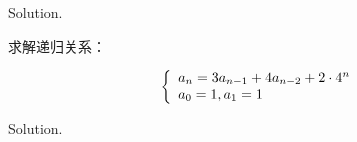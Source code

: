 \documentclass[cn, hazy, blue, normal, 12pt]{elegantnote}
\begin{document}
\begin{solution}[print=true]

    Solution.

\end{solution}

\begin{exercise}

    求解递归关系：

    \begin{equation}
        \notag
        \left\{\begin{array}{l}
            a_{n}=3 a_{n-1}+4 a_{n-2}+2 \cdot 4^{n} \\
            a_{0}=1, a_{1}=1
        \end{array}\right.
    \end{equation}

\end{exercise}

\begin{solution}[print=true]

    Solution.

\end{solution}
\end{document}
